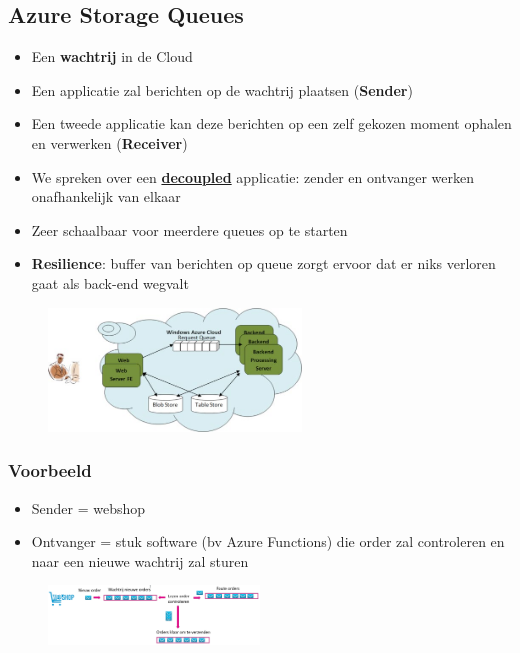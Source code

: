 \documentclass{article}
\newcommand{\bold}[1]{\textbf{#1}}
\begin{document}
\subsection{Azure Storage Queues}

\begin{itemize}
    \item Een \bold{wachtrij} in de Cloud
    \item Een applicatie zal berichten op de wachtrij plaatsen (\bold{Sender})
    \item Een tweede applicatie kan deze berichten op een zelf gekozen moment ophalen en verwerken (\bold{Receiver})
    \item We spreken over een \bold{\underline{decoupled}} applicatie: zender en ontvanger werken onafhankelijk van elkaar
    \item Zeer schaalbaar voor meerdere queues op te starten
    \item \bold{Resilience}: buffer van berichten op queue zorgt ervoor dat er niks verloren gaat als back-end wegvalt
\end{itemize}

\begin{figure}[H]
    \centering
    \includegraphics[width=0.6\textwidth]{azure-storage-queues.png}
    \caption{}
\end{figure}


\subsubsection{Voorbeeld}

\begin{itemize}
    \item Sender = webshop
    \item Ontvanger = stuk software (bv Azure Functions) die order zal controleren en naar een nieuwe wachtrij zal sturen
\end{itemize}

\begin{figure}[H]
    \centering
    \includegraphics[width=0.5\textwidth]{azure-storage-queues-voorbeeld.png}
    \caption{}
\end{figure}
\end{document}
